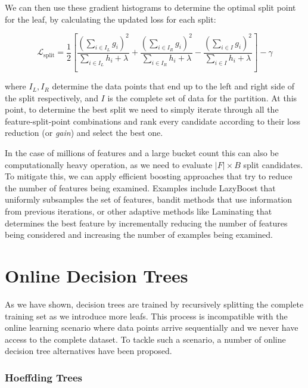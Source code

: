 We can then use these gradient histograms to determine the optimal split point for the
leaf, by calculating the updated loss for each split:

\begin{equation}
	\mathcal{L}_{\text{split}} = \frac{1}{2} \left[\frac{\left(\sum_{i \in I_{L}} g_{i} \right)^{2}} {\sum_{i \in I_{L}} h_{i}+ \lambda} + \frac{\left(\sum_{i \in I_{R}} g_{i} \right)^{2}}{\sum_{i \in I_{R}} h_{i} + \lambda} - \frac{\left(\sum_{i \in I}g_{i}\right)^{2}}{\sum_{i \in I}h_{i}+\lambda}\right]-\gamma
\end{equation}

where $I_L, I_R$ determine the data points that end up to the left and right side of the split
respectively, and $I$ is the complete set of data for the partition. At this point, to determine
the best split we need to simply iterate through all the feature-split-point combinations
and rank every candidate according to their loss reduction (or \textit{gain}) and select the
best one.

In the case of millions of features and a large bucket count this can also be
computationally heavy operation, as we need to evaluate $|F| \times B$ split candidates.
To mitigate this, we can apply efficient boosting approaches that try
to reduce the number of features being examined. Examples include LazyBoost \cite{lazyboost}
that uniformly subsamples the set of features,
bandit methods \cite{bandits-boosting} that use information from previous iterations, or other adaptive
methods like Laminating \cite{laminating} that determines the best feature by incrementally
reducing the number of features being considered and increasing the number of examples being
examined.

\section{Online Decision Trees}
\label{sec:bg-dt-online-trees}

As we have shown, decision trees are trained by recursively splitting the complete
training set as we introduce more leafs. This process is incompatible with the online
learning scenario where data points arrive sequentially and we never have access to
the complete dataset. To tackle such a scenario, a number of online decision tree
alternatives have been proposed.

\subsubsection*{Hoeffding Trees}

